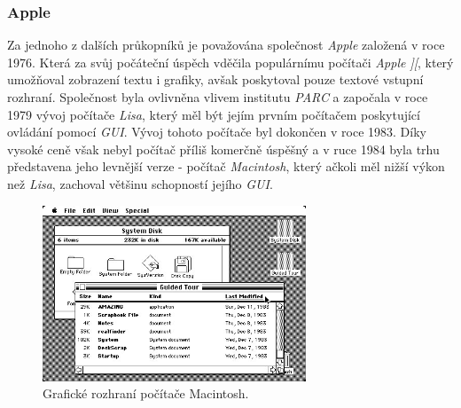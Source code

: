 \documentclass[11pt,twoside,a4paper]{book}
\begin{document}
\subsubsection{Apple}
Za jednoho z dalších průkopníků je považována společnost \textit{Apple} založená v roce 1976. Která za svůj počáteční úspěch vděčila populárnímu počítači \textit{Apple ][}, který umožňoval zobrazení textu i grafiky, avšak poskytoval pouze textové vstupní rozhraní. Společnost byla ovlivněna vlivem institutu \textit{PARC} a započala v roce 1979 vývoj počítače \textit{Lisa}, který měl být jejím prvním počítačem poskytující ovládání pomocí \textit{GUI}. Vývoj tohoto počítače byl dokončen v roce 1983. Díky vysoké ceně však nebyl počítač příliš komerčně úspěšný a v ruce 1984 byla trhu představena jeho levnější verze - počítač \textit{Macintosh}, který ačkoli měl nižší výkon než \textit{Lisa}, zachoval většinu schopností jejího \textit{GUI}.
\begin{figure}[!ht]
\begin{center}
  \includegraphics[width=0.7\textwidth]{mac}
\caption{{\label{fig:macGUI}} Grafické rozhraní počítače Macintosh.}
\end{center}
\end{figure}
\end{document}
